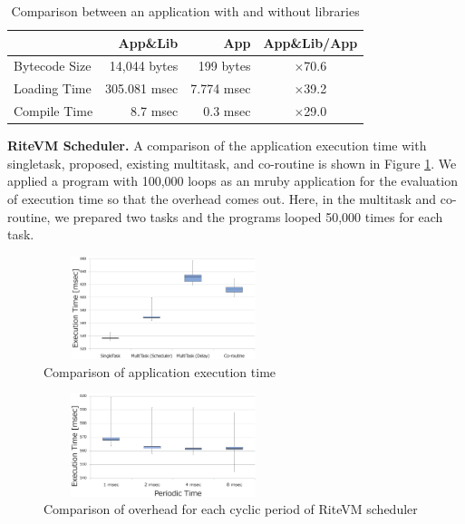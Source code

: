 \documentclass[conference]{IEEEtran/IEEEtran/IEEEtran}
\begin{document}
\begin{table}[t]
    \centering
    \vspace{-2mm}
\caption{Comparison between an application with and without libraries}
    \vspace{-2mm}
    {\tabcolsep=0.3cm
    \begin{tabular}{l||r|r|c}
                            & App\&Lib     & App        &   App\&Lib/App  \\ \hline
          Bytecode Size     & 14,044 bytes & 199 bytes  &   $\times$70.6          \\ %
          Loading Time      & 305.081 msec & 7.774 msec &   $\times$39.2          \\
          Compile Time      & 8.7 msec     & 0.3 msec   &   $\times$29.0          \\
    \end{tabular}
    }
          \vspace{-3mm}
    \label{tab:size_and_time}
\end{table}

{\bf RiteVM Scheduler.}
A comparison of the application execution time with singletask, proposed, existing multitask, and co-routine is shown in Figure \ref{fig:comparison_s_c_m}.
We applied a program with 100,000 loops as an mruby application for the evaluation of execution time so that the overhead comes out.
Here, in the multitask and co-routine, we prepared two tasks and the programs looped 50,000 times for each task.

\begin{figure}[t]
    \centering
    \includegraphics[height=3.0cm,width=7.0cm,clip]{figure/comparison_s_c_m.eps}
    \vspace{-3mm}
\caption{Comparison of application execution time}
    \vspace{-3mm}
\label{fig:comparison_s_c_m}
\end{figure}
\begin{figure}[t]
    \centering
    \includegraphics[height=3.0cm,width=7.0cm,clip]{figure/comparison_msec.eps}
    \vspace{-3mm}
\caption{Comparison of overhead for each cyclic period of RiteVM scheduler}
    \vspace{-3mm}
\label{fig:comparison_msec}
\end{figure}
\end{document}
